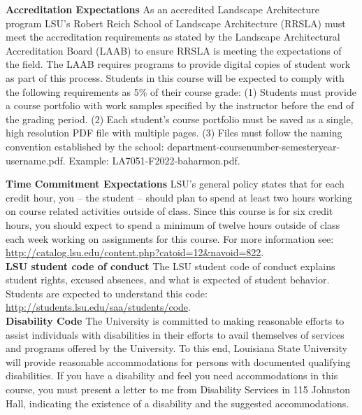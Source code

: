 \documentclass[11pt,article,oneside]{memoir}
\begin{document}
\noindent \textbf{Accreditation Expectations}
As an accredited Landscape Architecture program
LSU's Robert Reich School of Landscape Architecture (RRSLA) 
must meet the accreditation requirements 
as stated by the Landscape Architectural Accreditation
Board (LAAB) to ensure RRSLA is meeting the expectations of the field. 
The LAAB requires programs to provide digital copies 
of student work as part of this process.
Students in this course will be expected 
to comply with the following requirements
as 5\% of their course grade: 
(1) Students must provide a course portfolio
with work samples specified by the instructor 
before the end of the grading period. 
(2) Each student's course portfolio must be saved as 
a single, high resolution PDF file with multiple pages. 
(3) Files must follow the naming convention
established by the school: department-coursenumber-semesteryear-username.pdf.
Example: LA7051-F2022-baharmon.pdf.
\\

\clearpage

\noindent \textbf{Time Commitment Expectations}
LSU's general policy states that for each credit hour, you -- the student -- should plan to
spend at least two hours working on course related activities outside of class. Since this course is for six credit hours, you should expect to spend a minimum of twelve hours outside of class each week working on assignments for this course. For more information see: 
\url{http://catalog.lsu.edu/content.php?catoid=12&navoid=822}.
\\

\noindent \textbf{LSU student code of conduct}
The LSU student code of conduct explains student rights, excused absences, and what is expected of student behavior. Students are expected to understand this code:  \url{http://students.lsu.edu/saa/students/code}.
\\ %

\noindent \textbf{Disability Code}
The University is committed to making reasonable efforts to assist individuals with disabilities in
their efforts to avail themselves of services and programs offered by the University. To this end,
Louisiana State University will provide reasonable accommodations for persons with
documented qualifying disabilities. If you have a disability and feel you need accommodations in
this course, you must present a letter to me from Disability Services in 115 Johnston Hall,
indicating the existence of a disability and the suggested accommodations.
\\
\end{document}
